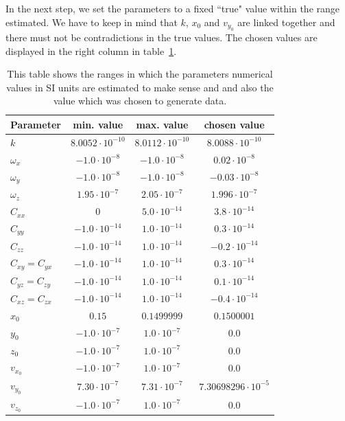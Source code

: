 \documentclass[prb,preprint]{revtex4-1}
\begin{document}
In the next step, we set the parameters to a fixed ``true" value within the range estimated. We have to keep in mind that $k$, $x_0$ and $v_{y_0}$ are linked together and there must not be contradictions in the true values. The chosen values are displayed in the right column in table~\ref{tab:parameters}.\\

\begin{table}[h]
	\centering
	\caption{This table shows the ranges in which the parameters numerical values in SI units are estimated to make sense and and also the value which was chosen to generate data.}
	\begin{ruledtabular}
		\begin{tabular}{l c c c}
			Parameter & min. value & max. value & chosen value \\
			\hline	%
			$k$ & $8.0052 \cdot 10^{-10}$ & $8.0112 \cdot 10^{-10}$ & $8.0088 \cdot 10^{-10}$ \\
			$\omega_x$ & $-1.0 \cdot 10^{-8}$ & $-1.0 \cdot 10^{-8}$ & $0.02 \cdot 10^{-8}$ \\
			$\omega_y$ & $-1.0 \cdot 10^{-8}$ & $-1.0 \cdot 10^{-8}$ & $-0.03 \cdot 10^{-8}$ \\
			$\omega_z$ & $1.95 \cdot 10^{-7}$ & $2.05 \cdot 10^{-7}$ & $1.996 \cdot 10^{-7}$ \\
			$C_{xx}$ & 0 & $5.0 \cdot 10^{-14}$ & $3.8 \cdot 10^{-14}$ \\
			$C_{yy}$ & $-1.0 \cdot 10^{-14}$ & $1.0 \cdot 10^{-14}$ & $0.3 \cdot 10^{-14}$ \\
			$C_{zz}$ & $-1.0 \cdot 10^{-14}$ & $1.0 \cdot 10^{-14}$ & $-0.2 \cdot 10^{-14}$ \\
			$C_{xy} = C_{yx}$ & $-1.0 \cdot 10^{-14}$ & $1.0 \cdot 10^{-14}$ & $0.3 \cdot 10^{-14}$ \\
			$C_{yz} = C_{zy}$ & $-1.0 \cdot 10^{-14}$ & $1.0 \cdot 10^{-14}$ & $0.1 \cdot 10^{-14}$ \\
			$C_{xz} = C_{zx}$ & $-1.0 \cdot 10^{-14}$ & $1.0 \cdot 10^{-14}$ & $-0.4 \cdot 10^{-14}$ \\
			$x_0$ & $0.15$ & $0.1499999$ & $0.1500001$ \\
			$y_0$ & $-1.0 \cdot 10^{-7}$ & $1.0 \cdot 10^{-7}$ & $0.0$ \\ 
			$z_0$ & $-1.0 \cdot 10^{-7}$ & $1.0 \cdot 10^{-7}$ & $0.0$ \\ 
			$v_{x_0}$ & $-1.0 \cdot 10^{-7}$ & $1.0 \cdot 10^{-7}$ & $0.0$ \\ 
			$v_{y_0}$ & $7.30 \cdot 10^{-7}$ & $7.31 \cdot 10^{-7}$ & $7.30698296 \cdot 10^{-5}$ \\
			$v_{z_0}$ & $-1.0 \cdot 10^{-7}$ & $1.0 \cdot 10^{-7}$ & $0.0$ \\
		\end{tabular}
	\end{ruledtabular}
	\label{tab:parameters}
\end{table}
\end{document}
